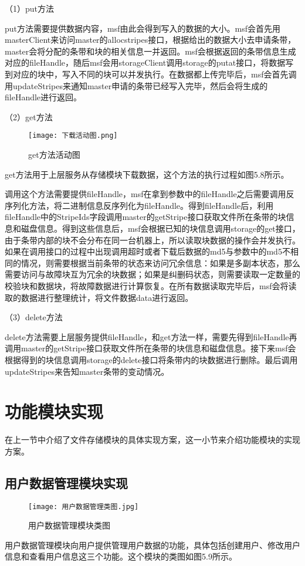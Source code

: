 （1）put方法

put方法需要提供数据内容，msf由此会得到写入的数据的大小。msf会首先用masterClient来访问master的allocstripes接口，根据给出的数据大小去申请条带，master会将分配的条带和块的相关信息一并返回。msf会根据返回的条带信息生成对应的fileHandle，随后msf会用storageClient调用storage的putat接口，将数据写到对应的块中，写入不同的块可以并发执行。在数据都上传完毕后，msf会首先调用updateStripes来通知master申请的条带已经写入完毕，然后会将生成的fileHandle进行返回。

（2）get方法
\begin{figure}[h]
  \centering
  \texttt{[image: 下载活动图.png]}
  \caption{get方法活动图}
\end{figure}

get方法用于上层服务从存储模块下载数据，这个方法的执行过程如图5.8所示。

调用这个方法需要提供fileHandle，msf在拿到参数中的fileHandle之后需要调用反序列化方法，将二进制信息反序列化为fileHandle。得到fileHandle后，利用fileHandle中的StripeIds字段调用master的getStripe接口获取文件所在条带的块信息和磁盘信息。得到这些信息后，msf会根据已知的块信息调用storage的get接口，由于条带内部的块不会分布在同一台机器上，所以读取块数据的操作会并发执行。如果在调用接口的过程中出现调用超时或者下载后数据的md5与参数中的md5不相同的情况，则需要根据当前条带的状态来访问冗余信息：如果是多副本状态，那么需要访问与故障块互为冗余的块数据；如果是纠删码状态，则需要读取一定数量的校验块和数据块，将故障数据进行计算恢复。在所有数据读取完毕后，msf会将读取的数据进行整理统计，将文件数据data进行返回。

（3）delete方法

delete方法需要上层服务提供fileHandle，和get方法一样，需要先得到fileHandle再调用master的getStripe接口获取文件所在条带的块信息和磁盘信息。接下来msf会根据得到的块信息调用storage的delete接口将条带内的块数据进行删除。最后调用updateStripes来告知master条带的变动情况。

\section{功能模块实现}%
在上一节中介绍了文件存储模块的具体实现方案，这一小节来介绍功能模块的实现方案。
\subsection{用户数据管理模块实现}

\begin{figure}
  \centering
  \texttt{[image: 用户数据管理类图.jpg]}
  \caption{用户数据管理模块类图}
\end{figure}
用户数据管理模块向用户提供管理用户数据的功能，具体包括创建用户、修改用户信息和查看用户信息这三个功能。这个模块的类图如图5.9所示。

